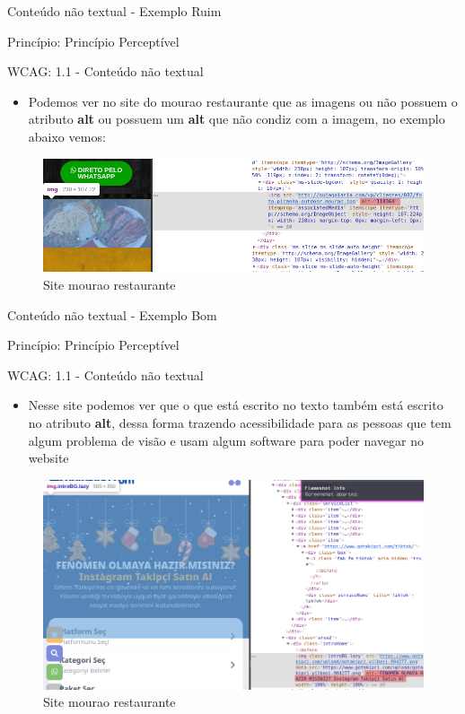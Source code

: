 \documentclass{beamer}
\begin{document}
\begin{frame}{Conteúdo não textual - Exemplo Ruim}

Princípio: Princípio Perceptível

WCAG: 1.1 - Conteúdo não textual

\begin{itemize}
	\item Podemos ver no site do mourao restaurante que as imagens ou não possuem o atributo \textbf{alt} ou possuem um \textbf{alt} que não condiz com a imagem, no exemplo abaixo vemos:
\end{itemize}
\begin{figure}
    \centering
    \includegraphics[scale=0.4]{images/no_alt.png}
    \caption{Site mourao restaurante}
\end{figure}

\end{frame}
\begin{frame}{Conteúdo não textual - Exemplo Bom}

Princípio: Princípio Perceptível

WCAG: 1.1 - Conteúdo não textual

\begin{itemize}
	\item Nesse site podemos ver que o que está escrito no texto também está escrito no atributo \textbf{alt}, dessa forma trazendo acessibilidade para as pessoas que tem algum problema de visão e usam algum software para poder navegar no website
\end{itemize}
\begin{figure}
    \centering
    \includegraphics[scale=0.25]{images/alt.png}
    \caption{Site mourao restaurante}
\end{figure}

\end{frame}
\end{document}
